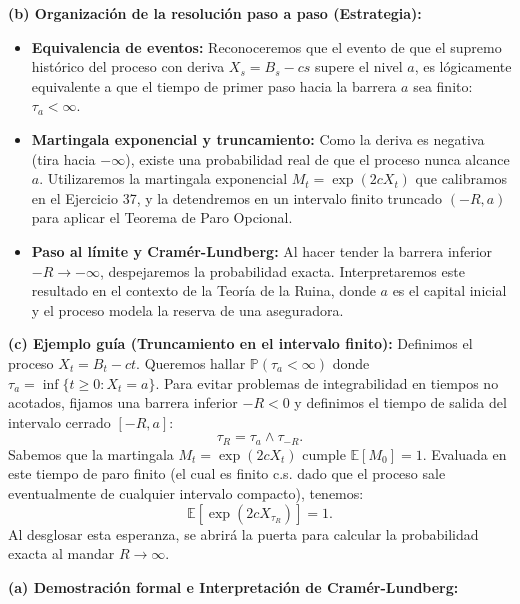 \documentclass[11pt, letterpaper]{article}
\begin{document}
\begin{solucion}
    \textbf{(b) Organización de la resolución paso a paso (Estrategia):}
    \begin{itemize}
        \item[(i)] \textbf{Equivalencia de eventos:} Reconoceremos que el evento de que el supremo histórico del proceso con deriva $X_s = B_s - cs$ supere el nivel $a$, es lógicamente equivalente a que el tiempo de primer paso hacia la barrera $a$ sea finito: $\tau_a < \infty$.
        \item[(ii)] \textbf{Martingala exponencial y truncamiento:} Como la deriva es negativa (tira hacia $-\infty$), existe una probabilidad real de que el proceso nunca alcance $a$. Utilizaremos la martingala exponencial $M_t = \exp(2c X_t)$ que calibramos en el Ejercicio 37, y la detendremos en un intervalo finito truncado $(-R, a)$ para aplicar el Teorema de Paro Opcional.
        \item[(iii)] \textbf{Paso al límite y Cramér-Lundberg:} Al hacer tender la barrera inferior $-R \to -\infty$, despejaremos la probabilidad exacta. Interpretaremos este resultado en el contexto de la Teoría de la Ruina, donde $a$ es el capital inicial y el proceso modela la reserva de una aseguradora.
    \end{itemize}

    \vspace{3mm}
    \textbf{(c) Ejemplo guía (Truncamiento en el intervalo finito):}
    Definimos el proceso $X_t = B_t - ct$. Queremos hallar $\mathbb{P}(\tau_a < \infty)$ donde $\tau_a = \inf\{t \ge 0 : X_t = a\}$.
    Para evitar problemas de integrabilidad en tiempos no acotados, fijamos una barrera inferior $-R < 0$ y definimos el tiempo de salida del intervalo cerrado $[-R, a]$:
    \[ \tau_R = \tau_a \wedge \tau_{-R}. \]
    Sabemos que la martingala $M_t = \exp(2c X_t)$ cumple $\mathbb{E}[M_0] = 1$. Evaluada en este tiempo de paro finito (el cual es finito c.s. dado que el proceso sale eventualmente de cualquier intervalo compacto), tenemos:
    \[ \mathbb{E}[\exp(2c X_{\tau_R})] = 1. \]
    Al desglosar esta esperanza, se abrirá la puerta para calcular la probabilidad exacta al mandar $R \to \infty$.

    \vspace{3mm}
    \textbf{(a) Demostración formal e Interpretación de Cramér-Lundberg:}


\end{solucion}
\end{document}
